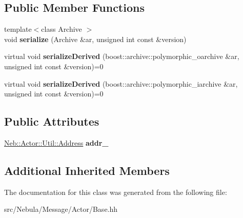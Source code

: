\subsection*{Public Member Functions}
\begin{DoxyCompactItemize}
\item 
\hypertarget{classNeb_1_1Message_1_1Actor_1_1Base_a961a74203562be229bb3bd1a047dc6d2}{{\footnotesize template$<$class Archive $>$ }\\void {\bfseries serialize} (Archive \&ar, unsigned int const \&version)}\label{classNeb_1_1Message_1_1Actor_1_1Base_a961a74203562be229bb3bd1a047dc6d2}

\item 
\hypertarget{classNeb_1_1Message_1_1Actor_1_1Base_ad8254e0566160c2c27eceae2c63584e9}{virtual void {\bfseries serialize\-Derived} (boost\-::archive\-::polymorphic\-\_\-oarchive \&ar, unsigned int const \&version)=0}\label{classNeb_1_1Message_1_1Actor_1_1Base_ad8254e0566160c2c27eceae2c63584e9}

\item 
\hypertarget{classNeb_1_1Message_1_1Actor_1_1Base_ab34802649e8cd87e5fcdeb9e49a94920}{virtual void {\bfseries serialize\-Derived} (boost\-::archive\-::polymorphic\-\_\-iarchive \&ar, unsigned int const \&version)=0}\label{classNeb_1_1Message_1_1Actor_1_1Base_ab34802649e8cd87e5fcdeb9e49a94920}

\end{DoxyCompactItemize}
\subsection*{Public Attributes}
\begin{DoxyCompactItemize}
\item 
\hypertarget{classNeb_1_1Message_1_1Actor_1_1Base_a2cd0619d9698dea1832247a90979b750}{\hyperlink{classNeb_1_1Actor_1_1Util_1_1Address}{Neb\-::\-Actor\-::\-Util\-::\-Address} {\bfseries addr\-\_\-}}\label{classNeb_1_1Message_1_1Actor_1_1Base_a2cd0619d9698dea1832247a90979b750}

\end{DoxyCompactItemize}
\subsection*{Additional Inherited Members}


The documentation for this class was generated from the following file\-:\begin{DoxyCompactItemize}
\item 
src/\-Nebula/\-Message/\-Actor/Base.\-hh\end{DoxyCompactItemize}
